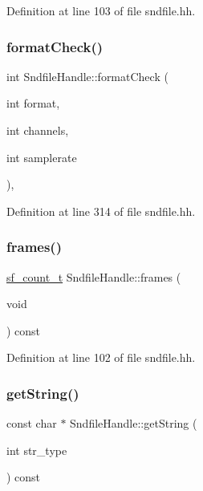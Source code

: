 Definition at line 103 of file sndfile.\+hh.

\mbox{\label{class_sndfile_handle_aeffce59efad6081b25cd1bb24bf37ef1}} 
\subsubsection{\texorpdfstring{formatCheck()}{formatCheck()}}
{\footnotesize\ttfamily int Sndfile\+Handle\+::format\+Check (\begin{DoxyParamCaption}\item[{int}]{format,  }\item[{int}]{channels,  }\item[{int}]{samplerate }\end{DoxyParamCaption})\hspace{0.3cm}{\ttfamily [inline]}, {\ttfamily [static]}}



Definition at line 314 of file sndfile.\+hh.

\mbox{\label{class_sndfile_handle_a12c7de95fd3134419bf755020d5a018c}} 
\subsubsection{\texorpdfstring{frames()}{frames()}}
{\footnotesize\ttfamily \mbox{\hyperlink{sndfile_8h_af2b12fded74bc949f1f1f392a2af4892}{sf\+\_\+count\+\_\+t}} Sndfile\+Handle\+::frames (\begin{DoxyParamCaption}\item[{void}]{ }\end{DoxyParamCaption}) const\hspace{0.3cm}{\ttfamily [inline]}}



Definition at line 102 of file sndfile.\+hh.

\mbox{\label{class_sndfile_handle_a22653a8f3f77584ae027179371d6bd9b}} 
\subsubsection{\texorpdfstring{getString()}{getString()}}
{\footnotesize\ttfamily const char $\ast$ Sndfile\+Handle\+::get\+String (\begin{DoxyParamCaption}\item[{int}]{str\+\_\+type }\end{DoxyParamCaption}) const\hspace{0.3cm}{\ttfamily [inline]}}




